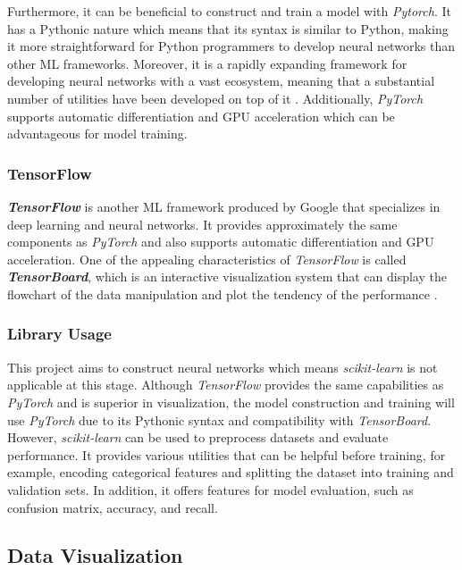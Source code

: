 \documentclass[12pt,twoside]{report}
\begin{document}
Furthermore, it can be beneficial to construct and train a model with \textit{Pytorch}. It has a Pythonic nature which means that its syntax is similar to Python, making it more straightforward for Python programmers to develop neural networks than other ML frameworks. Moreover, it is a rapidly expanding framework for developing neural networks with a vast ecosystem, meaning that a substantial number of utilities have been developed on top of it \citep{RN5}. Additionally, \textit{PyTorch} supports automatic differentiation and GPU acceleration which can be advantageous for model training.

\subsubsection{TensorFlow}
\textit{\textbf{TensorFlow}} is another ML framework produced by Google that specializes in deep learning and neural networks. It provides approximately the same components as \textit{PyTorch} and also supports automatic differentiation and GPU acceleration. One of the appealing characteristics of \textit{TensorFlow} is called \textit{\textbf{TensorBoard}}, which is an interactive visualization system that can display the flowchart of the data manipulation and plot the tendency of the performance \citep{RN15}. 

\subsubsection{Library Usage}
This project aims to construct neural networks which means \textit{scikit-learn} is not applicable at this stage. Although \textit{TensorFlow} provides the same capabilities as \textit{PyTorch} and is superior in visualization, the model construction and training will use \textit{PyTorch} due to its Pythonic syntax and compatibility with \textit{TensorBoard}. 
\\

However, \textit{scikit-learn} can be used to preprocess datasets and evaluate performance. It provides various utilities that can be helpful before training, for example, encoding categorical features and splitting the dataset into training and validation sets. In addition, it offers features for model evaluation, such as confusion matrix, accuracy, and recall. 

\subsection{Data Visualization}
\end{document}
